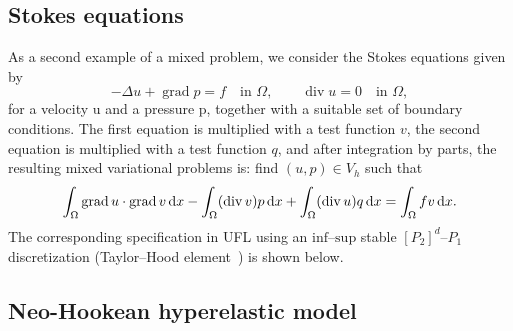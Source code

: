 \documentclass[prodmode,acmtoms]{acmsmall}
\DeclareMathOperator{\Div}{div}
\DeclareMathOperator{\Grad}{grad}
\newcommand{\dx}{\dif{}x}
\begin{document}

\subsection{Stokes equations}

As a second example of a mixed problem, we consider the Stokes
equations given by
\begin{equation}
  -\Delta u + \Grad p = f \quad \text{in } \Omega, \qquad
               \Div u = 0 \quad \text{in } \Omega,
\end{equation}
for a velocity u and a pressure p,
together with a suitable set of boundary conditions. The first
equation is multiplied with a test function $v$, the second equation
is multiplied with a test function $q$, and after integration by
parts, the resulting mixed variational problems is: find $(u, p) \in
V_h$ such that
\begin{equation}
  \int_{\Omega} \Grad u \cdot \Grad v \dx -
  \int_{\Omega} (\Div v) p \dx +
  \int_{\Omega} (\Div u) q \dx
  =
  \int_{\Omega} fv \dx.
\end{equation}
The corresponding specification in UFL using an
$\mathrm{inf}$--$\mathrm{sup}$ stable $[P_2]^d$--$P_1$ discretization
(Taylor--Hood element~\citep{TaylorHood1973}) is shown below.


\subsection{Neo-Hookean hyperelastic model}
\end{document}
